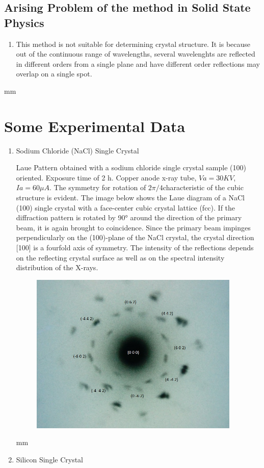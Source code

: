 \documentclass[12pt]{article}
\begin{document}
\subsection{Arising Problem of the method in Solid State Physics}
\begin {enumerate}
\item This method is not suitable for determining crystal structure. It is because out of the continuous range of wavelengths, several wavelenghts are reflected in different orders from a single plane and have different order reflections may overlap on a single spot.
\end{enumerate}
 mm
\section{Some Experimental Data}
\begin{enumerate}
\item Sodium Chloride (NaCl) Single Crystal

Laue Pattern obtained with a sodium chloride single crystal sample (100) oriented. Exposure time of 2 h. Copper anode x-ray tube, $Va = 30 KV$, $Ia = 60 \mu A$. The symmetry for rotation of $2\pi / 4 $characteristic of the cubic structure is evident.
The image below shows the Laue diagram of a NaCl (100) single crystal with a face-center cubic crystal lattice (fcc). If the diffraction pattern is rotated by 90° around the direction of the primary beam, it is again brought to coincidence. Since the primary beam impinges perpendicularly on the (100)-plane of the NaCl crystal, the crystal direction [100] is a fourfold axis of symmetry. The intensity of the reflections depends on the reflecting crystal surface as well as on the spectral intensity distribution of the X-rays.
\begin{figure}[h!]
  \centering \includegraphics[width= 10cm] {NaCl.jpg}
\end{figure}
 mm
\item Silicon Single Crystal


\end{enumerate}
\end{document}
